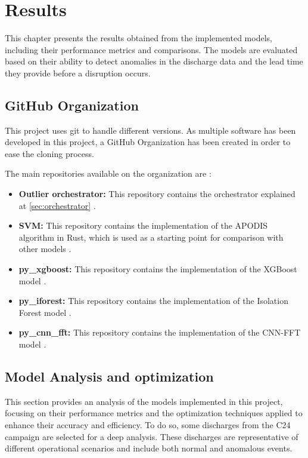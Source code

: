 \chapter{Results}\label{sec:cap4}

This chapter presents the results obtained from the implemented models, including their performance metrics and comparisons. The models are evaluated based on their ability to detect anomalies in the discharge data and the lead time they provide before a disruption occurs.

\section{GitHub Organization}

This project uses git to handle different versions. As multiple software has been developed in this project, a GitHub Organization has been created in order to ease the cloning process.

The main repositories available on the organization are \autocite{OutlierClassifier}:

\begin{itemize}
    \item \textbf{Outlier orchestrator:} This repository contains the orchestrator explained at \autoref{sec:orchestrator} \autocite{OutlierClassifierOutlier_orchestrator2025a}.
    \item \textbf{SVM:} This repository contains the implementation of the \ac{APODIS} algorithm in Rust, which is used as a starting point for comparison with other models \autocite{OutlierClassifierSvm2025}.
    \item \textbf{py\_xgboost:} This repository contains the implementation of the XGBoost model \autocite{OutlierClassifierPy_xgboost2025}.
    \item \textbf{py\_iforest:} This repository contains the implementation of the Isolation Forest model \autocite{OutlierClassifierPy_iforestPython}.
    \item \textbf{py\_cnn\_fft:} This repository contains the implementation of the CNN-FFT model \autocite{OutlierClassifierPy_cnn_fftCNN}.
\end{itemize}

\section{Model Analysis and optimization}

This section provides an analysis of the models implemented in this project, focusing on their performance metrics and the optimization techniques applied to enhance their accuracy and efficiency. To do so, some discharges from the C24 campaign are selected for a deep analysis. These discharges are representative of different operational scenarios and include both normal and anomalous events.

